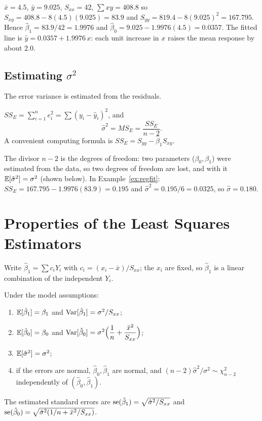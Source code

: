 \begin{example}\label{ex:regfit}
$\bar{x}=4.5$, $\bar{y}=9.025$, $S_{xx}=42$, $\sum xy=408.8$ so $S_{xy}=408.8-8(4.5)(9.025)=83.9$ and $S_{yy}=819.4-8(9.025)^2=167.795$. Hence $\hat\beta_1=83.9/42=1.9976$ and $\hat\beta_0=9.025-1.9976(4.5)=0.0357$. The fitted line is $\hat{y}=0.0357+1.9976\,x$: each unit increase in $x$ raises the mean response by about $2.0$.
\end{example}

\subsection*{Estimating $\sigma^2$}

The error variance is estimated from the residuals.

\begin{definition}
$SS_E=\sum_{i=1}^ne_i^2=\sum(y_i-\hat{y}_i)^2$, and
\[ \hat\sigma^2=MS_E=\frac{SS_E}{n-2}. \]
A convenient computing formula is $SS_E=S_{yy}-\hat\beta_1S_{xy}$.
\end{definition}

The divisor $n-2$ is the degrees of freedom: two parameters ($\beta_0,\beta_1$) were estimated from the data, so two degrees of freedom are lost, and with it $\mathbb{E}[\hat\sigma^2]=\sigma^2$ (shown below). In Example~\ref{ex:regfit}: $SS_E=167.795-1.9976(83.9)=0.195$ and $\hat\sigma^2=0.195/6=0.0325$, so $\hat\sigma=0.180$.

\section{Properties of the Least Squares Estimators}

Write $\hat\beta_1=\sum c_iY_i$ with $c_i=(x_i-\bar{x})/S_{xx}$; the $x_i$ are fixed, so $\hat\beta_1$ is a linear combination of the independent $Y_i$.

\begin{theorem}\label{thm:lsprops}
Under the model assumptions:
\begin{enumerate}[label=(\roman*)]
  \item $\mathbb{E}[\hat\beta_1]=\beta_1$ and $\operatorname{Var}[\hat\beta_1]=\sigma^2/S_{xx}$;
  \item $\mathbb{E}[\hat\beta_0]=\beta_0$ and $\operatorname{Var}[\hat\beta_0]=\sigma^2\Big(\dfrac1n+\dfrac{\bar{x}^2}{S_{xx}}\Big)$;
  \item $\mathbb{E}[\hat\sigma^2]=\sigma^2$;
  \item if the errors are normal, $\hat\beta_0,\hat\beta_1$ are normal, and $(n-2)\hat\sigma^2/\sigma^2\sim\chi^2_{n-2}$ independently of $(\hat\beta_0,\hat\beta_1)$.
\end{enumerate}
The estimated standard errors are $\operatorname{se}(\hat\beta_1)=\sqrt{\hat\sigma^2/S_{xx}}$ and $\operatorname{se}(\hat\beta_0)=\sqrt{\hat\sigma^2(1/n+\bar{x}^2/S_{xx})}$.
\end{theorem}

